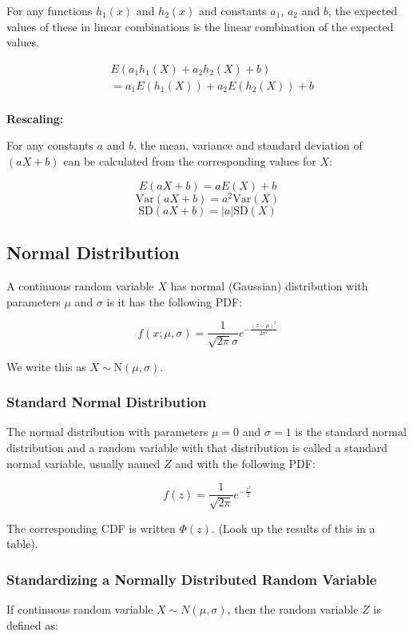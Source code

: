 For any functions $h_1(x)$ and $h_2(x)$ and constants $a_1$, $a_2$ and $b$, the expected values of these in linear combinations is the linear combination of the expected values.

\begin{align*}
       & E(a_1h_1(X) + a_2h_2(X) + b)      \\
       & = a_1E(h_1(X)) + a_2E(h_2(X)) + b \\
\end{align*}

\textbf{Rescaling:}

For any constants $a$ and $b$, the mean, variance and standard deviation of $(aX+b)$ can be calculated from the corresponding values for $X$:

$$ E(aX+b) = aE(X) + b $$
$$ \text{Var}(aX+b) = a^2\text{Var}(X) $$
$$ \text{SD}(aX+b) = |a|\text{SD}(X) $$

\subsection*{Normal Distribution}

A continuous random variable $X$ has normal (Gaussian) distribution with parameters $\mu$ and $\sigma$ is it has the following PDF:

$$ f(x; \mu,\sigma) = \frac{1}{\sqrt{2\pi}\sigma} e^{-\frac{(x-\mu)^2}{2\sigma^2}} $$

We write this as $X \sim \text{N}(\mu,\sigma)$.

\subsubsection*{Standard Normal Distribution}

The normal distribution with parameters $\mu = 0$ and $\sigma = 1$ is the standard normal distribution and a random variable with that distribution is called a standard normal variable, usually named $Z$ and with the following PDF:

$$ f(z) = \frac{1}{\sqrt{2\pi}} e^{-\frac{z^2}{2}} $$

The corresponding CDF is written $\Phi(z)$. (Look up the results of this in a table).

\subsubsection*{Standardizing a Normally Distributed Random Variable}

If continuous random variable $X \sim N(\mu, \sigma)$, then the random variable $Z$ is defined as:

